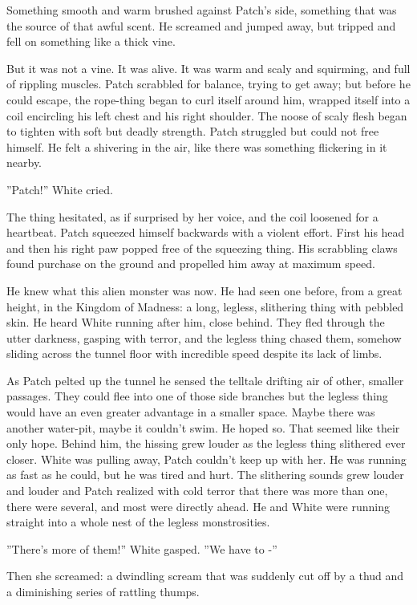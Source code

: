 \documentclass[12pt]{book}
\begin{document}
Something smooth and warm brushed against Patch's side, something that was the source of that awful scent. He screamed and jumped away, but tripped and fell on something like a thick vine.

But it was not a vine. It was alive. It was warm and scaly and squirming, and full of rippling muscles. Patch scrabbled for balance, trying to get away; but before he could escape, the rope-thing began to curl itself around him, wrapped itself into a coil encircling his left chest and his right shoulder. The noose of scaly flesh began to tighten with soft but deadly strength. Patch struggled but could not free himself. He felt a shivering in the air, like there was something flickering in it nearby.

''Patch!'' White cried.

The thing hesitated, as if surprised by her voice, and the coil loosened for a heartbeat. Patch squeezed himself backwards with a violent effort. First his head and then his right paw popped free of the squeezing thing. His scrabbling claws found purchase on the ground and propelled him away at maximum speed.

He knew what this alien monster was now. He had seen one before, from a great height, in the Kingdom of Madness: a long, legless, slithering thing with pebbled skin. He heard White running after him, close behind. They fled through the utter darkness, gasping with terror, and the legless thing chased them, somehow sliding across the tunnel floor with incredible speed despite its lack of limbs.

As Patch pelted up the tunnel he sensed the telltale drifting air of other, smaller passages. They could flee into one of those side branches %
but the legless thing would have an even greater advantage in a smaller space. Maybe there was another water-pit, maybe it couldn't swim. He hoped so. That seemed like their only hope. Behind him, the hissing grew louder as the legless thing slithered ever closer. White was pulling away, Patch couldn't keep up with her. He was running as fast as he could, but he was tired and hurt. The slithering sounds grew louder and louder %
and Patch realized with cold terror that there was more than one, there were several, and most were directly ahead. He and White were running straight into a whole nest of the legless monstrosities.

''There's more of them!'' White gasped. ''We have to -''

Then she screamed: a dwindling scream that was suddenly cut off by a thud and a diminishing series of rattling thumps.
\end{document}
